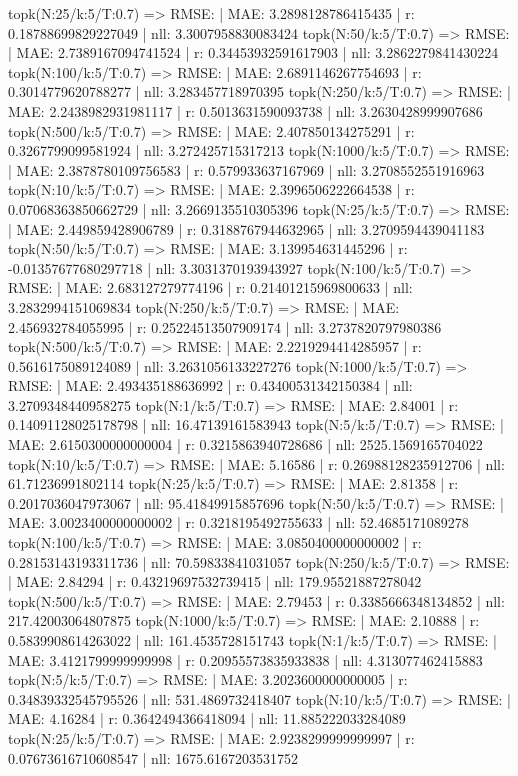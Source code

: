 topk(N:25/k:5/T:0.7) => RMSE: | MAE: 3.2898128786415435 | r: 0.18788699829227049 | nll: 3.3007958830083424
topk(N:50/k:5/T:0.7) => RMSE: | MAE: 2.7389167094741524 | r: 0.34453932591617903 | nll: 3.2862279841430224
topk(N:100/k:5/T:0.7) => RMSE: | MAE: 2.6891146267754693 | r: 0.3014779620788277 | nll: 3.283457718970395
topk(N:250/k:5/T:0.7) => RMSE: | MAE: 2.2438982931981117 | r: 0.5013631590093738 | nll: 3.2630428999907686
topk(N:500/k:5/T:0.7) => RMSE: | MAE: 2.407850134275291 | r: 0.3267799099581924 | nll: 3.272425715317213
topk(N:1000/k:5/T:0.7) => RMSE: | MAE: 2.3878780109756583 | r: 0.579933637167969 | nll: 3.2708552551916963
topk(N:10/k:5/T:0.7) => RMSE: | MAE: 2.3996506222664538 | r: 0.07068363850662729 | nll: 3.2669135510305396
topk(N:25/k:5/T:0.7) => RMSE: | MAE: 2.449859428906789 | r: 0.3188767944632965 | nll: 3.2709594439041183
topk(N:50/k:5/T:0.7) => RMSE: | MAE: 3.139954631445296 | r: -0.01357677680297718 | nll: 3.3031370193943927
topk(N:100/k:5/T:0.7) => RMSE: | MAE: 2.683127279774196 | r: 0.21401215969800633 | nll: 3.2832994151069834
topk(N:250/k:5/T:0.7) => RMSE: | MAE: 2.456932784055995 | r: 0.25224513507909174 | nll: 3.2737820797980386
topk(N:500/k:5/T:0.7) => RMSE: | MAE: 2.2219294414285957 | r: 0.5616175089124089 | nll: 3.2631056133227276
topk(N:1000/k:5/T:0.7) => RMSE: | MAE: 2.493435188636992 | r: 0.43400531342150384 | nll: 3.2709348440958275
topk(N:1/k:5/T:0.7) => RMSE: | MAE: 2.84001 | r: 0.14091128025178798 | nll: 16.47139161583943
topk(N:5/k:5/T:0.7) => RMSE: | MAE: 2.6150300000000004 | r: 0.3215863940728686 | nll: 2525.1569165704022
topk(N:10/k:5/T:0.7) => RMSE: | MAE: 5.16586 | r: 0.26988128235912706 | nll: 61.71236991802114
topk(N:25/k:5/T:0.7) => RMSE: | MAE: 2.81358 | r: 0.2017036047973067 | nll: 95.41849915857696
topk(N:50/k:5/T:0.7) => RMSE: | MAE: 3.0023400000000002 | r: 0.3218195492755633 | nll: 52.4685171089278
topk(N:100/k:5/T:0.7) => RMSE: | MAE: 3.0850400000000002 | r: 0.28153143193311736 | nll: 70.59833841031057
topk(N:250/k:5/T:0.7) => RMSE: | MAE: 2.84294 | r: 0.43219697532739415 | nll: 179.95521887278042
topk(N:500/k:5/T:0.7) => RMSE: | MAE: 2.79453 | r: 0.3385666348134852 | nll: 217.42003064807875
topk(N:1000/k:5/T:0.7) => RMSE: | MAE: 2.10888 | r: 0.5839908614263022 | nll: 161.4535728151743
topk(N:1/k:5/T:0.7) => RMSE: | MAE: 3.4121799999999998 | r: 0.20955573835933838 | nll: 4.313077462415883
topk(N:5/k:5/T:0.7) => RMSE: | MAE: 3.2023600000000005 | r: 0.34839332545795526 | nll: 531.4869732418407
topk(N:10/k:5/T:0.7) => RMSE: | MAE: 4.16284 | r: 0.3642494366418094 | nll: 11.885222033284089
topk(N:25/k:5/T:0.7) => RMSE: | MAE: 2.9238299999999997 | r: 0.07673616710608547 | nll: 1675.6167203531752

